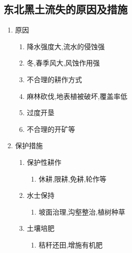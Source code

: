 \documentclass[a4paper]{article}
\begin{document}
    \subsection{东北黑土流失的原因及措施}
    \begin{enumerate}
        \item 原因
        \begin{enumerate}
            \item 降水强度大,流水的侵蚀强
            \item 冬,春季风大,风蚀作用强
            \item 不合理的耕作方式
            \item 麻林砍伐,地表植被破坏,覆盖率低
            \item 过度开垦
            \item 不合理的开矿等
        \end{enumerate}
        \item 保护措施
        \begin{enumerate}
            \item 保护性耕作
            \begin{enumerate}
                \item 休耕,限耕,免耕,轮作等
            \end{enumerate}
            \item 水士保持
            \begin{enumerate}
                \item 坡面治理,沟壑整治,植树种草
            \end{enumerate}
            \item 土壤培肥
            \begin{enumerate}
                \item 秸秆还田,增施有机肥
            \end{enumerate}
        \end{enumerate}
    \end{enumerate}
\end{document}
